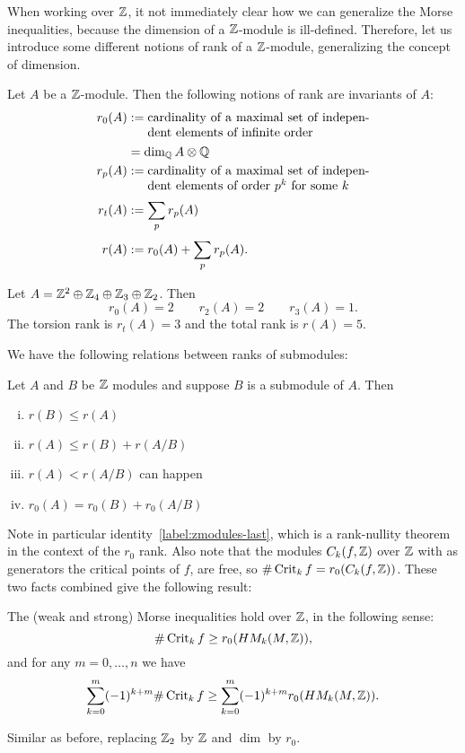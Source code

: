 When working over $\Z$, it not immediately clear how we can generalize the Morse inequalities, because the dimension of a $ \Z$-module is ill-defined.
Therefore, let us introduce some different notions of rank of a $\Z$-module, generalizing the concept of dimension.
\begin{definition}
    Let $A$ be a  $\Z$-module. Then the following notions of rank are invariants of $A$:
    \begin{align*}
        r_0(A) &:= \parbox[t]{6.2cm}{cardinality of a maximal set of independent elements of infinite order}\\[0.3em]
            &= \dim_{\Q} A \otimes \Q\\
        r_p(A) &:= \parbox[t]{6.2cm}{cardinality of a maximal set of independent elements of order $p^{k}$ for some $k$}\\[0.3em]
        r_t(A) &:= \sum_{p} r_p(A)\\[0.3em]
        r(A) &:= r_0(A) + \sum_{p}r_p(A)
    .\end{align*}
\end{definition}
\begin{eg}
    Let $A = \Z^2 \oplus \Z_4 \oplus \Z_3 \oplus \Z_2$.
    Then
    \[
        r_0(A) = 2 \qquad
        r_2(A) = 2 \qquad
        r_3(A) = 1
    .\]
    The torsion rank is $r_t(A) = 3$ and the total rank is $r(A) = 5$.
\end{eg}
We have the following relations between ranks of submodules:
\begin{lemma}
    Let $A$ and $B$ be $\Z$ modules and suppose $B$ is a submodule of $A$.
    Then
    \begin{enumerate}[(i)]
        \item $r(B) \le  r(A)$
        \item $r(A) \le  r(B) + r(A / B)$
        \item $r(A) < r(A / B)$ can happen
        \item  $ r_0(A) = r_0(B) + r_0(A/B)$ \label{label:zmodules-last}
    \end{enumerate}
\end{lemma}

Note in particular identity~\ref{label:zmodules-last}, which is a rank-nullity theorem in the context of the $r_0$ rank.
Also note that the modules $C_k(f, \Z)$ over $\Z$ with as generators the critical points of $f$, are free, so $\# \Crit_k f =r_0(C_k(f, \Z))$.
These two facts combined give the following result:
\begin{prop}
    The (weak and strong) Morse inequalities hold over $\Z$, in the following sense:
    \[
        \# \Crit_k f \ge  r_0(\HMf[k]{M, \Z})
    ,\]
    and for any $m = 0, \ldots, n$ we have
        \[
            \sum_{k=0}^{m} (-1)^{k+m} \# \Crit_k f \ge  \sum_{k=0}^{m} (-1)^{k+m} r_0(\HMf[k]{M, \Z})
        .\]
\end{prop}
\begin{myproof}
    Similar as before, replacing $\Z_2$ by $\Z$ and $\dim$ by $r_0$.
\end{myproof}




